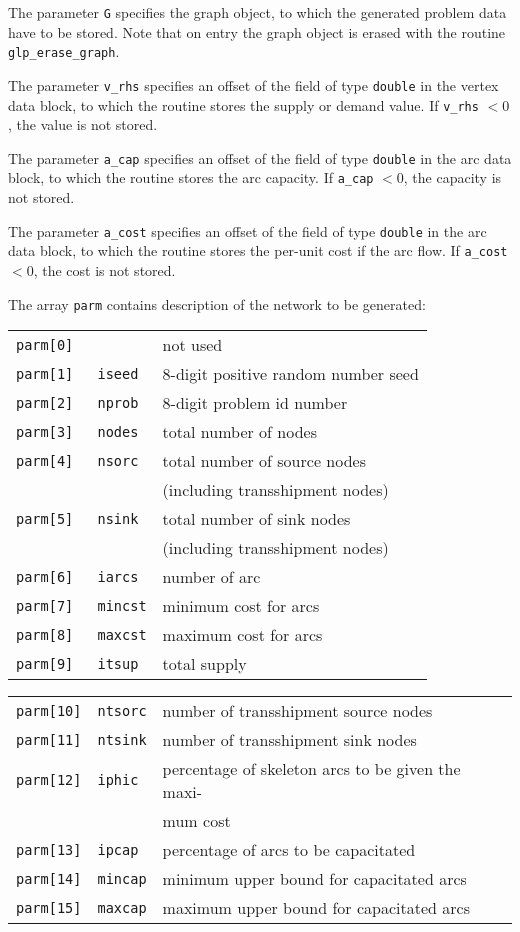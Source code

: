 The parameter \verb|G| specifies the graph object, to which the
generated  problem data have to be stored. Note that on entry the graph
object  is erased with the routine \verb|glp_erase_graph|.

The parameter \verb|v_rhs| specifies an offset of the field of type
\verb|double| in the vertex data block, to which the routine stores the
supply or  demand value. If \verb|v_rhs| $<0$, the value is not stored.

The parameter \verb|a_cap| specifies an offset of the field of type
\verb|double| in the arc data block, to which the routine stores the
arc capacity. If \verb|a_cap| $<0$, the capacity is not stored.

The parameter \verb|a_cost| specifies an offset of the field of type
\verb|double| in the arc data block, to which the routine stores the
per-unit cost if the arc flow. If \verb|a_cost| $<0$, the cost is not
stored.

The array \verb|parm| contains description of the network to be
generated:

\begin{tabular}{@{}lll@{}}
\verb|parm[0] |&             &not used\\
\verb|parm[1] |&\verb|iseed |&8-digit positive random number seed\\
\verb|parm[2] |&\verb|nprob |&8-digit problem id number\\
\verb|parm[3] |&\verb|nodes |&total number of nodes\\
\verb|parm[4] |&\verb|nsorc |&total number of source nodes\\
&&(including transshipment nodes)\\
\verb|parm[5] |&\verb|nsink |&total number of sink nodes\\
&&(including transshipment nodes)\\
\verb|parm[6] |&\verb|iarcs |&number of arc\\
\verb|parm[7] |&\verb|mincst|&minimum cost for arcs\\
\verb|parm[8] |&\verb|maxcst|&maximum cost for arcs\\
\verb|parm[9] |&\verb|itsup |&total supply\\
\end{tabular}

\begin{tabular}{@{}lll@{}}
\verb|parm[10]|&\verb|ntsorc|&number of transshipment source nodes\\
\verb|parm[11]|&\verb|ntsink|&number of transshipment sink nodes\\
\verb|parm[12]|&\verb|iphic |&percentage of skeleton arcs to be given
the maxi-\\&&mum cost\\
\verb|parm[13]|&\verb|ipcap |&percentage of arcs to be capacitated\\
\verb|parm[14]|&\verb|mincap|&minimum upper bound for capacitated arcs\\
\verb|parm[15]|&\verb|maxcap|&maximum upper bound for capacitated arcs\\
\end{tabular}

